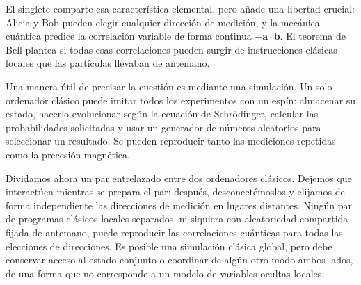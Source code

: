 El singlete comparte esa característica elemental, pero añade una libertad crucial: Alicia y Bob pueden elegir cualquier dirección de medición, y la mecánica cuántica predice la correlación variable de forma continua \(-\bm a\cdot\bm b\). El teorema de Bell plantea si todas esas correlaciones pueden surgir de instrucciones clásicas locales que las partículas llevaban de antemano.

\begin{classroomqa}
\end{classroomqa}

\begin{classroomqa}
\end{classroomqa}

Una manera útil de precisar la cuestión es mediante una simulación. Un solo ordenador clásico puede imitar todos los experimentos con un espín: almacenar su estado, hacerlo evolucionar según la ecuación de Schr\"odinger, calcular las probabilidades solicitadas y usar un generador de números aleatorios para seleccionar un resultado. Se pueden reproducir tanto las mediciones repetidas como la precesión magnética.

Dividamos ahora un par entrelazado entre dos ordenadores clásicos. Dejemos que interactúen mientras se prepara el par; después, desconectémoslos y elijamos de forma independiente las direcciones de medición en lugares distantes. Ningún par de programas clásicos locales separados, ni siquiera con aleatoriedad compartida fijada de antemano, puede reproducir las correlaciones cuánticas para todas las elecciones de direcciones. Es posible una simulación clásica global, pero debe conservar acceso al estado conjunto o coordinar de algún otro modo ambos lados, de una forma que no corresponde a un modelo de variables ocultas locales.

